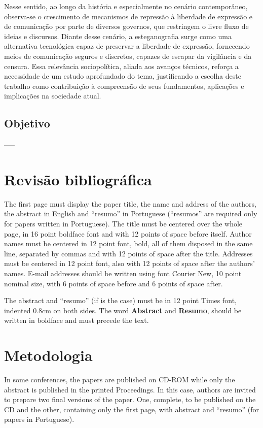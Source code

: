\documentclass[12pt]{article}
\begin{document}
Nesse sentido, ao longo da história e especialmente no cenário contemporâneo,
observa-se o crescimento de mecanismos de repressão à liberdade de expressão e
de comunicação por parte de diversos governos, que restringem o livre fluxo de
ideias e discursos. Diante desse cenário, a esteganografia surge como uma
alternativa tecnológica capaz de preservar a liberdade de expressão, fornecendo
meios de comunicação seguros e discretos, capazes de escapar da vigilância e da
censura. Essa relevância sociopolítica, aliada aos avanços técnicos, reforça a
necessidade de um estudo aprofundado do tema, justificando a escolha deste
trabalho como contribuição à compreensão de seus fundamentos, aplicações e
implicações na sociedade atual.

\subsection{Objetivo}

-----

\section{Revisão bibliográfica} \label{sec:firstpage}

The first page must display the paper title, the name and address of the
authors, the abstract in English and ``resumo'' in Portuguese (``resumos'' are
required only for papers written in Portuguese). The title must be centered
over the whole page, in 16 point boldface font and with 12 points of space
before itself. Author names must be centered in 12 point font, bold, all of
them disposed in the same line, separated by commas and with 12 points of space
after the title. Addresses must be centered in 12 point font, also with 12
points of space after the authors' names. E-mail addresses should be written
using font Courier New, 10 point nominal size, with 6 points of space before
and 6 points of space after.

The abstract and ``resumo'' (if is the case) must be in 12 point Times font,
indented 0.8cm on both sides. The word \textbf{Abstract} and \textbf{Resumo},
should be written in boldface and must precede the text.

\section{Metodologia}

In some conferences, the papers are published on CD-ROM while only the abstract
is published in the printed Proceedings. In this case, authors are invited to
prepare two final versions of the paper. One, complete, to be published on the
CD and the other, containing only the first page, with abstract and ``resumo''
(for papers in Portuguese).
\end{document}
